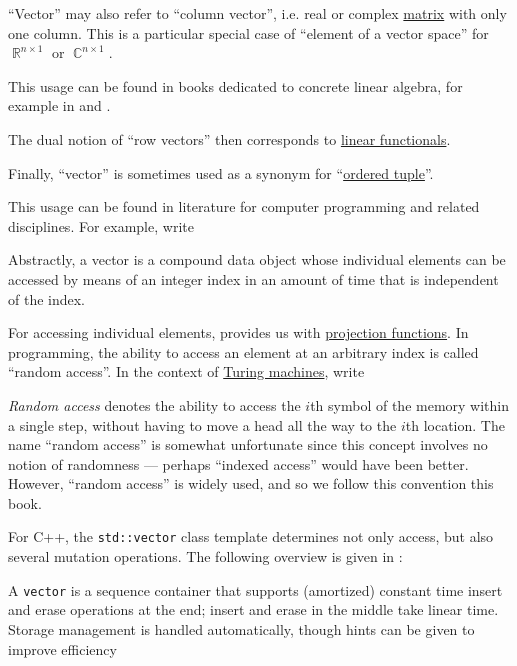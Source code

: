 \begin{remark}
\begin{thmenum}
     \enquote{Vector} may also refer to \enquote{column vector}, i.e. real or complex \hyperref[def:array/matrix]{matrix} with only one column. This is a particular special case of \enquote{element of a vector space} for \( \BbbR^{n \times 1} \) or \( \BbbC^{n \times 1} \).

    This usage can be found in books dedicated to concrete linear algebra, for example in
    \cite[def. 1.1]{Stewart1998MatrixAlgorithmsVol1} and \cite[37]{Тыртышников2007ЛинейнаяАлгебра}.

    The dual notion of \enquote{row vectors} then corresponds to \hyperref[def:dual_vector_space]{linear functionals}.

     Finally, \enquote{vector} is sometimes used as a synonym for \enquote{\hyperref[def:ordered_tuple]{ordered tuple}}.

    This usage can be found in literature for computer programming and related disciplines. For example, \cite[724]{AbelsonSussman2012eSICP} write
    \begin{displayquote}
      Abstractly, a vector is a compound data object whose individual elements can be accessed by means of an integer index in an amount of time that is independent of the index.
    \end{displayquote}

    For accessing individual elements,  provides us with \hyperref[def:cartesian_product_projection]{projection functions}. In programming, the ability to access an element at an arbitrary index is called \enquote{random access}. In the context of \hyperref[def:turing_machine]{Turing machines}, \textcite{AroraBarak2009ComputationalComplexity} write
    \begin{displayquote}
      \textit{Random access} denotes the ability to access the \( i \)th symbol of the memory within a single step, without having to move a head all the way to the \( i \)th location. The name \enquote{random access} is somewhat unfortunate since this concept involves no notion of randomness --- perhaps \enquote{indexed access} would have been better. However, \enquote{random access} is widely used, and so we follow this convention this book.
    \end{displayquote}

    For C++, the \Verb|std::vector| class template determines not only access, but also several mutation operations. The following overview is given in \cite[\S 24.3.11]{ISO:14882:2024}:
    \begin{displayquote}
      A \Verb|vector| is a sequence container that supports (amortized) constant time insert and erase operations at the end; insert and erase in the middle take linear time. Storage management is handled automatically, though hints can be given to improve efficiency
    \end{displayquote}


\end{thmenum}
\end{remark}
